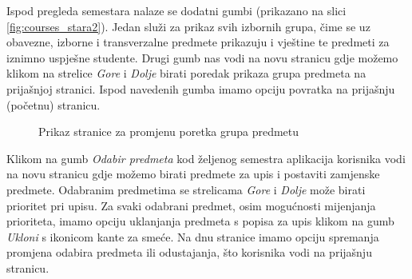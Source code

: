 \documentclass[times, utf8, zavrsni, numeric]{fer}
\begin{document}
        Ispod pregleda semestara nalaze se dodatni gumbi (prikazano na slici \ref{fig:courses_stara2}). Jedan služi za prikaz svih izbornih grupa, čime se uz obavezne, izborne i transverzalne predmete prikazuju i vještine te predmeti za iznimno uspješne studente. Drugi gumb nas vodi na novu stranicu gdje možemo klikom na strelice \textit{Gore} i \textit{Dolje} birati poredak prikaza grupa predmeta na prijašnjoj stranici. Ispod navedenih gumba imamo opciju povratka na prijašnju (početnu) stranicu.
        
        \begin{figure} [H]
          \centering
          \caption{Prikaz stranice za promjenu poretka grupa predmetu}
        \end{figure}
        
        Klikom na gumb \textit{Odabir predmeta} kod željenog semestra aplikacija korisnika vodi na novu stranicu gdje možemo birati predmete za upis i postaviti zamjenske predmete. Odabranim predmetima se strelicama \textit{Gore} i \textit{Dolje} može birati prioritet pri upisu. Za svaki odabrani predmet, osim mogućnosti mijenjanja prioriteta, imamo opciju uklanjanja predmeta s popisa za upis klikom na gumb \textit{Ukloni} s ikonicom kante za smeće. Na dnu stranice imamo opciju spremanja promjena odabira predmeta ili odustajanja, što korisnika vodi na prijašnju stranicu.
        
\end{document}
